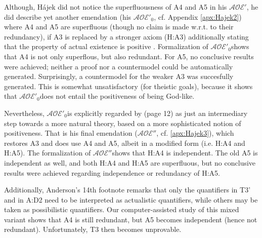 \documentclass{birkjour}
\newcommand{\AOEH}{$\mathcal{AOE}'$}
\newcommand{\AOEHH}{$\mathcal{AOE}'_0$}
\newcommand{\AOEHHH}{$\mathcal{AOE}''$}
\theoremstyle{definition}
\theoremstyle{remark}
\numberwithin{equation}{section}
\begin{document}
Although, Hájek did not notice the superfluousness of A4 and A5 in his \AOEH, he did describe yet another emendation (his \AOEHH, cf. Appendix \ref{apx:Hajek2}) where A4 and A5 are superfluous (though no claim is made w.r.t. to their redundancy), if A3 is replaced by a stronger axiom (H:A3) additionally stating that the property of actual existence is positive \cite[sec.~5]{Hajek2002}. Formalization of \AOEHH shows that A4 is not only superflous, but also redundant. For A5, no conclusive results were achieved; neither a proof nor a countermodel could be automatically generated. Surprisingly, a countermodel for the weaker A3 was succesfully generated. This is somewhat unsatisfactory (for theistic goals), because it shows that \AOEHH does not entail the positiveness of being God-like.

Nevertheless, \AOEHH is explicitly regarded by \citet[p.~12]{Hajek2002} (page 12) as just an intermediary step towards a more natural theory, based on a more sophisticated notion of positiveness. That is his final emendation (\AOEHHH, cf. \ref{apx:Hajek3}), which restores A3 and does use A4 and A5, albeit in a modified form (i.e. H:A4 and H:A5). The formalization of \AOEHHH shows that H:A4 is independent. The old A5 is independent as well, and both H:A4 and H:A5 are superfluous, but no conclusive results were achieved regarding independence or redundancy of H:A5.

Additionally, Anderson's 14th footnote \citep[footnote 14]{anderson90:_some_emend_of_goedel_ontol_proof} remarks that only the quantifiers in T3' and in A:D2 need to be interpreted as actualistic quantifiers, while others may be taken as possibilistic quantifiers. Our computer-assisted study of this mixed variant shows that A4 is still redundant, but A5 becomes independent (hence not redundant). Unfortunately, T3 then becomes unprovable.
\end{document}
